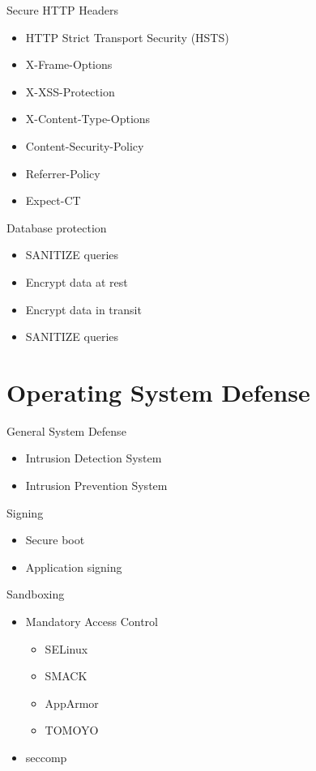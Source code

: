 \documentclass{curs}
\begin{document}
\begin{frame}{Secure HTTP Headers}
  \begin{itemize}
    \item HTTP Strict Transport Security (HSTS)
    \item X-Frame-Options
    \item X-XSS-Protection
    \item X-Content-Type-Options
    \item Content-Security-Policy
    \item Referrer-Policy
    \item Expect-CT
  \end{itemize}
\end{frame}

\begin{frame}{Database protection}
  \begin{itemize}
    \item SANITIZE queries
    \item Encrypt data at rest
    \item Encrypt data in transit
    \item SANITIZE queries
  \end{itemize}
\end{frame}


\section{Operating System Defense}

\begin{frame}{General System Defense}
  \begin{itemize}
    \item Intrusion Detection System
    \item Intrusion Prevention System
  \end{itemize}
\end{frame}

\begin{frame}{Signing}
  \begin{itemize}
    \item Secure boot
    \item Application signing
  \end{itemize}
\end{frame}

\begin{frame}{Sandboxing}
  \begin{itemize}
    \item Mandatory Access Control
      \begin{itemize}
        \item SELinux
        \item SMACK
        \item AppArmor
        \item TOMOYO
      \end{itemize}
    \item seccomp
  \end{itemize}
\end{frame}
\end{document}

